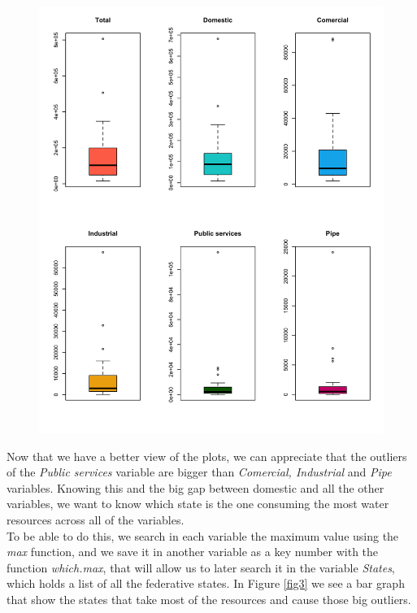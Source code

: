 \documentclass{article}
\begin{document}
\begin{figure}[htp]
	\centering
	\includegraphics[width=\linewidth]{prueba1.png}
	\caption{}\label{fig2}
\end{figure}

\clearpage

Now that we have a better view of the plots, we can appreciate that the outliers of the \textit{Public services} variable are bigger than \textit{Comercial, Industrial} and \textit{Pipe} variables. Knowing this and the big gap between domestic and all the other variables, we want to know which state is the one consuming the most water resources across all of the variables. \\

To be able to do this, we search in each variable the maximum value using the \textit{max} function, and we save it in another variable as a key number with the function \textit{which.max}, that will allow us to later search it in the variable \textit{States}, which holds a list of all the federative states. In Figure \ref{fig3} we see a bar graph that show the states that take most of the resources and cause those big outliers.\\
\end{document}
